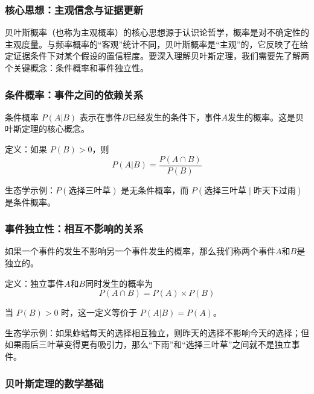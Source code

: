 \documentclass[
  twoside,12pt,fontset=none]{ctexbook}
\begin{document}
\hypertarget{ux6838ux5fc3ux601dux60f3ux4e3bux89c2ux4fe1ux5ff5ux4e0eux8bc1ux636eux66f4ux65b0}{%
\subsubsection{核心思想：主观信念与证据更新}\label{ux6838ux5fc3ux601dux60f3ux4e3bux89c2ux4fe1ux5ff5ux4e0eux8bc1ux636eux66f4ux65b0}}

贝叶斯概率（也称为主观概率）的核心思想源于认识论哲学，概率是对不确定性的主观度量。与频率概率的``客观''统计不同，贝叶斯概率是``主观''的，它反映了在给定证据条件下对某个假设的置信程度。要深入理解贝叶斯定理，我们需要先了解两个关键概念：条件概率和事件独立性。

\hypertarget{ux6761ux4ef6ux6982ux7387ux4e8bux4ef6ux4e4bux95f4ux7684ux4f9dux8d56ux5173ux7cfb}{%
\subsubsection{条件概率：事件之间的依赖关系}\label{ux6761ux4ef6ux6982ux7387ux4e8bux4ef6ux4e4bux95f4ux7684ux4f9dux8d56ux5173ux7cfb}}

条件概率 \(P(A|B)\) 表示在事件\(B\)已经发生的条件下，事件\(A\)发生的概率。这是贝叶斯定理的核心概念。

定义：如果 \(P(B) > 0\)，则
\[P(A|B) = \frac{P(A \cap B)}{P(B)}\]

生态学示例：\(P(\text{选择三叶草})\) 是无条件概率，而 \(P(\text{选择三叶草} \mid \text{昨天下过雨})\) 是条件概率。

\hypertarget{ux4e8bux4ef6ux72ecux7acbux6027ux76f8ux4e92ux4e0dux5f71ux54cdux7684ux5173ux7cfb}{%
\subsubsection{事件独立性：相互不影响的关系}\label{ux4e8bux4ef6ux72ecux7acbux6027ux76f8ux4e92ux4e0dux5f71ux54cdux7684ux5173ux7cfb}}

如果一个事件的发生不影响另一个事件发生的概率，那么我们称两个事件\(A\)和\(B\)是独立的。

定义：独立事件\(A\)和\(B\)同时发生的概率为
\[P(A \cap B) = P(A) \times P(B)\]

当 \(P(B) > 0\) 时，这一定义等价于 \(P(A|B) = P(A)\)。

生态学示例：如果蚱蜢每天的选择相互独立，则昨天的选择不影响今天的选择；但如果雨后三叶草变得更有吸引力，那么``下雨''和``选择三叶草''之间就不是独立事件。

\hypertarget{ux8d1dux53f6ux65afux5b9aux7406ux7684ux6570ux5b66ux57faux7840}{%
\subsubsection{贝叶斯定理的数学基础}\label{ux8d1dux53f6ux65afux5b9aux7406ux7684ux6570ux5b66ux57faux7840}}
\end{document}
